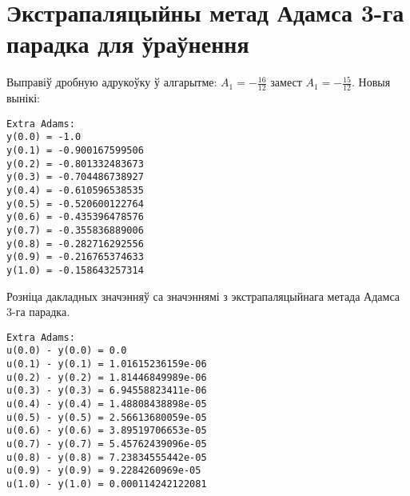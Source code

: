 \documentclass{article}
\begin{document}
\section*{Экстрапаляцыйны метад Адамса 3-га парадка для ўраўнення}
Выправіў дробную адрукоўку ў алгарытме: $A_1 = - \frac{16}{12}$ замест $A_1 = - \frac{15}{12}$.
Новыя вынікі:
{\small
\begin{verbatim}
Extra Adams:
y(0.0) = -1.0
y(0.1) = -0.900167599506
y(0.2) = -0.801332483673
y(0.3) = -0.704486738927
y(0.4) = -0.610596538535
y(0.5) = -0.520600122764
y(0.6) = -0.435396478576
y(0.7) = -0.355836889006
y(0.8) = -0.282716292556
y(0.9) = -0.216765374633
y(1.0) = -0.158643257314
\end{verbatim}
}
Розніца дакладных значэнняў са значэннямі з экстрапаляцыйнага метада Адамса 3-га парадка.
{\small
\begin{verbatim}
Extra Adams:
u(0.0) - y(0.0) = 0.0
u(0.1) - y(0.1) = 1.01615236159e-06
u(0.2) - y(0.2) = 1.81446849989e-06
u(0.3) - y(0.3) = 6.94558823411e-06
u(0.4) - y(0.4) = 1.48808438898e-05
u(0.5) - y(0.5) = 2.56613680059e-05
u(0.6) - y(0.6) = 3.89519706653e-05
u(0.7) - y(0.7) = 5.45762439096e-05
u(0.8) - y(0.8) = 7.23834555442e-05
u(0.9) - y(0.9) = 9.2284260969e-05
u(1.0) - y(1.0) = 0.000114242122081
\end{verbatim}
}
\end{document}
